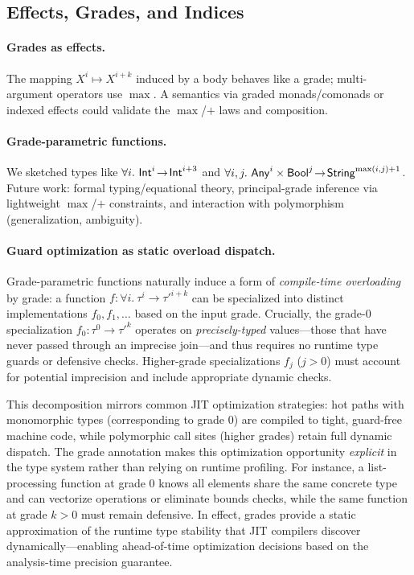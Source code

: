 \subsection{Effects, Grades, and Indices}
\paragraph{Grades as effects.}
The mapping $X^{i}\mapsto X^{i+k}$ induced by a body behaves like a grade; multi-argument operators use $\max$. A semantics via graded monads/comonads or indexed effects could validate the $\max$/$+$ laws and composition.

\paragraph{Grade-parametric functions.}
We sketched types like $\forall i.\ \Int^i\!\to\!\Int^{i+3}$ and $\forall i,j.\ \mathsf{Any}^i\times\mathsf{Bool}^j\!\to\!\mathsf{String}^{\max(i,j)+1}$. Future work: formal typing/equational theory, principal-grade inference via lightweight $\max$/$+$ constraints, and interaction with polymorphism (generalization, ambiguity).

\paragraph{Guard optimization as static overload dispatch.}
Grade-parametric functions naturally induce a form of \emph{compile-time overloading} by grade: a function $f : \forall i.\ \tau^i \to \tau'^{i+k}$ can be specialized into distinct implementations $f_0, f_1, \ldots$ based on the input grade. 
Crucially, the grade-$0$ specialization $f_0 : \tau^0 \to \tau'^k$ operates on \emph{precisely-typed} values—those that have never passed through an imprecise join—and thus requires no runtime type guards or defensive checks.
Higher-grade specializations $f_j$ ($j > 0$) must account for potential imprecision and include appropriate dynamic checks.

This decomposition mirrors common JIT optimization strategies: hot paths with monomorphic types (corresponding to grade $0$) are compiled to tight, guard-free machine code, while polymorphic call sites (higher grades) retain full dynamic dispatch.
The grade annotation makes this optimization opportunity \emph{explicit} in the type system rather than relying on runtime profiling.
For instance, a list-processing function at grade $0$ knows all elements share the same concrete type and can vectorize operations or eliminate bounds checks, while the same function at grade $k > 0$ must remain defensive.
In effect, grades provide a static approximation of the runtime type stability that JIT compilers discover dynamically—enabling ahead-of-time optimization decisions based on the analysis-time precision guarantee.

